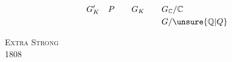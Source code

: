 \[
\begin{aligned}
G'_{K} \quad P \qquad G_{K} &\qquad G_{\mathbb{C}} / \mathbb{C} \\
                            &\qquad G / \unsure{\mathbb{Q}|Q}
\end{aligned}
\]


\noindent\textsc{Extra Strong}\\
 1808
